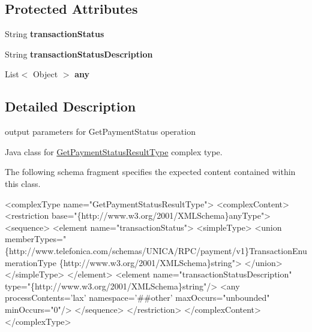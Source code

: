 \subsection*{Protected Attributes}
\begin{DoxyCompactItemize}
\item 
\hypertarget{classcom_1_1telefonica_1_1schemas_1_1unica_1_1rpc_1_1payment_1_1v1_1_1GetPaymentStatusResultType_af214a3d69bcc62d92db2b57735ffdb0c}{
String {\bfseries transactionStatus}}
\label{classcom_1_1telefonica_1_1schemas_1_1unica_1_1rpc_1_1payment_1_1v1_1_1GetPaymentStatusResultType_af214a3d69bcc62d92db2b57735ffdb0c}

\item 
\hypertarget{classcom_1_1telefonica_1_1schemas_1_1unica_1_1rpc_1_1payment_1_1v1_1_1GetPaymentStatusResultType_a27bb7826f0537bbb1ecc49bfd1bac920}{
String {\bfseries transactionStatusDescription}}
\label{classcom_1_1telefonica_1_1schemas_1_1unica_1_1rpc_1_1payment_1_1v1_1_1GetPaymentStatusResultType_a27bb7826f0537bbb1ecc49bfd1bac920}

\item 
\hypertarget{classcom_1_1telefonica_1_1schemas_1_1unica_1_1rpc_1_1payment_1_1v1_1_1GetPaymentStatusResultType_a019ba2ac1f2cfdb9f3f88fd56c3944d6}{
List$<$ Object $>$ {\bfseries any}}
\label{classcom_1_1telefonica_1_1schemas_1_1unica_1_1rpc_1_1payment_1_1v1_1_1GetPaymentStatusResultType_a019ba2ac1f2cfdb9f3f88fd56c3944d6}

\end{DoxyCompactItemize}


\subsection{Detailed Description}
output parameters for GetPaymentStatus operation

Java class for \hyperlink{classcom_1_1telefonica_1_1schemas_1_1unica_1_1rpc_1_1payment_1_1v1_1_1GetPaymentStatusResultType}{GetPaymentStatusResultType} complex type.

The following schema fragment specifies the expected content contained within this class.


\begin{DoxyPre}
 <complexType name="GetPaymentStatusResultType">
   <complexContent>
     <restriction base="\{http://www.w3.org/2001/XMLSchema\}anyType">
       <sequence>
         <element name="transactionStatus">
           <simpleType>
             <union memberTypes=" \{http://www.telefonica.com/schemas/UNICA/RPC/payment/v1\}TransactionEnumerationType \{http://www.w3.org/2001/XMLSchema\}string">
             </union>
           </simpleType>
         </element>
         <element name="transactionStatusDescription" type="\{http://www.w3.org/2001/XMLSchema\}string"/>
         <any processContents='lax' namespace='\##other' maxOccurs="unbounded" minOccurs="0"/>
       </sequence>
     </restriction>
   </complexContent>
 </complexType>
 \end{DoxyPre}
 

